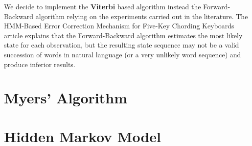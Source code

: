 We decide to implement the \textbf{Viterbi} based algorithm instead the Forward-Backward algorithm relying on the 
experiments carried out in the literature.
The HMM-Based Error Correction Mechanism for Five-Key Chording Keyboards article \cite{tarniceriu2015hmm} explains 
that the Forward-Backward algorithm estimates the most likely state for each observation, but the resulting state 
sequence may not be a valid succession of words in natural language (or a very unlikely word sequence) and produce 
inferior results.

\section{Myers' Algorithm}


\section{Hidden Markov Model}



